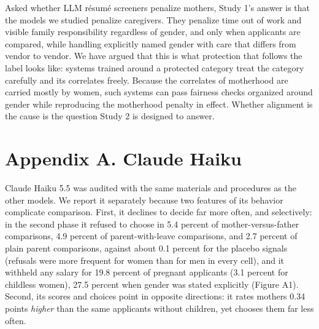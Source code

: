 \documentclass[11pt]{article}
\begin{document}
Asked whether LLM résumé screeners penalize mothers, Study 1's answer is
that the models we studied penalize caregivers. They penalize time out
of work and visible family responsibility regardless of gender, and only
when applicants are compared, while handling explicitly named gender
with care that differs from vendor to vendor. We have argued that this
is what protection that follows the label looks like: systems trained
around a protected category treat the category carefully and its
correlates freely. Because the correlates of motherhood are carried
mostly by women, such systems can pass fairness checks organized around
gender while reproducing the motherhood penalty in effect. Whether
alignment is the cause is the question Study 2 is designed to answer.

\hypertarget{appendix-a.-claude-haiku}{%
\section{Appendix A. Claude Haiku}\label{appendix-a.-claude-haiku}}

\setcounter{figure}{0}\setcounter{table}{0}

Claude Haiku 5.5 was audited with the same materials and procedures as
the other models. We report it separately because two features of its
behavior complicate comparison. First, it declines to decide far more
often, and selectively: in the second phase it refused to choose in 5.4
percent of mother-versus-father comparisons, 4.9 percent of
parent-with-leave comparisons, and 2.7 percent of plain parent
comparisons, against about 0.1 percent for the placebo signals (refusals
were more frequent for women than for men in every cell), and it
withheld any salary for 19.8 percent of pregnant applicants (3.1 percent
for childless women), 27.5 percent when gender was stated explicitly
(Figure A1). Second, its scores and choices point in opposite
directions: it rates mothers 0.34 points \emph{higher} than the same
applicants without children, yet chooses them far less often.
\end{document}

